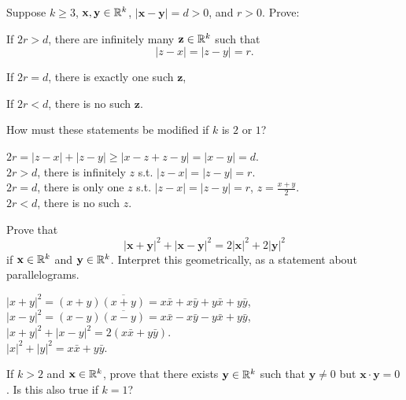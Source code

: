 \begin{myExercise}
    \label{ex:1.16}
    Suppose $k \geq 3$, $\mathbf{x}, \mathbf{y} \in {\protect\mathbb R}^k$, $|\mathbf{x} - \mathbf{y}| =d>0$, and $r >0$. Prove:
    \begin{asparaenum}[(a)]
        \item If $2r > d$, there are infinitely many $\mathbf{z} \in {\protect\mathbb R}^k$ such that
        \begin{equation*}
            |z-x| =|z-y| =r.
        \end{equation*}        
        \item If $2r = d$, there is exactly one such $\mathbf{z}$,
        \item If $2r < d$, there is no such $\mathbf{z}$.
    \end{asparaenum}
    How must these statements be modified if $k$ is $2$ or $1$?
\end{myExercise}

\mySolve
$2r = |z-x|+|z-y| \geq |x-z+z-y| = |x-y| = d$.\\
$2r > d$, there is infinitely $z$ s.t. $|z-x| =|z-y| =r$.\\
$2r = d$, there is only one $z$ s.t. $|z-x| =|z-y| =r$, $z = \frac{x+y}{2}$.\\
$2r < d$, there is no such $z$.


\begin{myExercise}
    \label{ex:1.17}
    Prove that
    \begin{equation*}
        |\mathbf{x} + \mathbf{y}|^2 + 
        |\mathbf{x} - \mathbf{y}|^2 =
        2|\mathbf{x}|^2 + 2|\mathbf{y}|^2
    \end{equation*}
    if $\mathbf{x} \in {\protect\mathbb R}^k$ and $\mathbf{y} \in {\protect\mathbb R}^k$. Interpret this geometrically, as a statement about parallelograms.
\end{myExercise}

\mySolve
$|x+y|^2 = (x+y)\overline{(x+y)} = x\bar{x} + x\bar{y} + y\bar{x} + y\bar{y}$, \\
$|x-y|^2 = (x-y)\overline{(x-y)} = x\bar{x} - x\bar{y} - y\bar{x} + y\bar{y}$, \\
$|x+y|^2 + |x-y|^2 = 2(x\bar{x} + y\bar{y})$. \\
$|x|^2 + |y|^2 = x\bar{x} + y\bar{y}$.


\begin{myExercise}
    \label{ex:1.18}
    If $k >2$ and $\mathbf{x}\in {\protect\mathbb R}^k$, prove that there exists $\mathbf{y} \in {\protect\mathbb R}^k$ such that $\mathbf{y} \neq 0$ but $\mathbf{x}\cdot\mathbf{y} =0$.
    Is this also true if $k =1$?
\end{myExercise}

